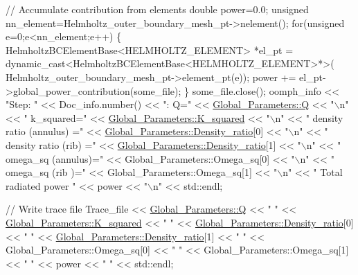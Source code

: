 \begin{DoxyCodeInclude}
{{ \textcolor{comment}{// Accumulate contribution from elements}
 \textcolor{keywordtype}{double} power=0.0;
 \textcolor{keywordtype}{unsigned} nn\_element=Helmholtz\_outer\_boundary\_mesh\_pt->nelement(); 
 \textcolor{keywordflow}{for}(\textcolor{keywordtype}{unsigned} e=0;e<nn\_element;e++)
  \{
   HelmholtzBCElementBase<HELMHOLTZ\_ELEMENT> *el\_pt = 
    \textcolor{keyword}{dynamic\_cast<}HelmholtzBCElementBase<HELMHOLTZ\_ELEMENT>*\textcolor{keyword}{>}(
     Helmholtz\_outer\_boundary\_mesh\_pt->element\_pt(e)); 
   power += el\_pt->global\_power\_contribution(some\_file);
  \}
 some\_file.close();
 oomph\_info << \textcolor{stringliteral}{"Step: "} << Doc\_info.number() 
            << \textcolor{stringliteral}{": Q="} << \hyperlink{namespaceGlobal__Parameters_a7814fddf663e56168174a42d2cd6b4c1}{Global\_Parameters::Q}  << \textcolor{stringliteral}{"\(\backslash\)n"}
            << \textcolor{stringliteral}{" k\_squared="} << \hyperlink{namespaceGlobal__Parameters_a91a3fa265abaf9e724c668ee800ffb29}{Global\_Parameters::K\_squared}  << \textcolor{stringliteral}{"\(\backslash\)n"}
            << \textcolor{stringliteral}{" density ratio (annulus) ="} 
            << \hyperlink{namespaceGlobal__Parameters_a517d4c31b8bce6563c2f605266dd9679}{Global\_Parameters::Density\_ratio}[0]  << \textcolor{stringliteral}{"\(\backslash\)n"}
            << \textcolor{stringliteral}{" density ratio (rib)     ="} 
            << \hyperlink{namespaceGlobal__Parameters_a517d4c31b8bce6563c2f605266dd9679}{Global\_Parameters::Density\_ratio}[1]  << \textcolor{stringliteral}{"\(\backslash\)n"}
            << \textcolor{stringliteral}{" omega\_sq (annulus)="} << Global\_Parameters::Omega\_sq[0]  << \textcolor{stringliteral}{"\(\backslash\)n"}
            << \textcolor{stringliteral}{" omega\_sq (rib    )="} << Global\_Parameters::Omega\_sq[1]  << \textcolor{stringliteral}{"\(\backslash\)n"}
            << \textcolor{stringliteral}{" Total radiated power "} << power  << \textcolor{stringliteral}{"\(\backslash\)n"}
            << std::endl; 


 \textcolor{comment}{// Write trace file}
 Trace\_file << \hyperlink{namespaceGlobal__Parameters_a7814fddf663e56168174a42d2cd6b4c1}{Global\_Parameters::Q} << \textcolor{stringliteral}{" "} 
            << \hyperlink{namespaceGlobal__Parameters_a91a3fa265abaf9e724c668ee800ffb29}{Global\_Parameters::K\_squared} << \textcolor{stringliteral}{" "}
            << \hyperlink{namespaceGlobal__Parameters_a517d4c31b8bce6563c2f605266dd9679}{Global\_Parameters::Density\_ratio}[0] << \textcolor{stringliteral}{" "}
            << \hyperlink{namespaceGlobal__Parameters_a517d4c31b8bce6563c2f605266dd9679}{Global\_Parameters::Density\_ratio}[1] << \textcolor{stringliteral}{" "}
            << Global\_Parameters::Omega\_sq[0] << \textcolor{stringliteral}{" "}
            << Global\_Parameters::Omega\_sq[1] << \textcolor{stringliteral}{" "}
            << power << \textcolor{stringliteral}{" "} 
            << std::endl;
  
}}
\end{DoxyCodeInclude}
